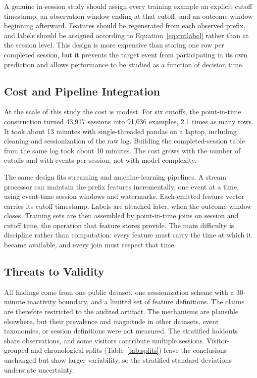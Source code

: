 \documentclass[conference, letterpaper]{IEEEtran}
\begin{document}
A genuine in-session study should assign every training example an explicit cutoff timestamp, an observation window ending at that cutoff, and an outcome window beginning afterward. Features should be regenerated from each observed prefix, and labels should be assigned according to Equation~\ref{eq:cutlabel} rather than at the session level. This design is more expensive than storing one row per completed session, but it prevents the target event from participating in its own prediction and allows performance to be studied as a function of decision time.

\subsection{Cost and Pipeline Integration}
At the scale of this study the cost is modest. For six cutoffs, the point-in-time construction turned 43,917 sessions into 91,036 examples, 2.1 times as many rows. It took about 13 minutes with single-threaded pandas on a laptop, including cleaning and sessionization of the raw log. Building the completed-session table from the same log took about 10 minutes. The cost grows with the number of cutoffs and with events per session, not with model complexity.

The same design fits streaming and machine-learning pipelines. A stream processor can maintain the prefix features incrementally, one event at a time, using event-time session windows and watermarks. Each emitted feature vector carries its cutoff timestamp. Labels are attached later, when the outcome window closes. Training sets are then assembled by point-in-time joins on session and cutoff time, the operation that feature stores provide. The main difficulty is discipline rather than computation: every feature must carry the time at which it became available, and every join must respect that time.

\subsection{Threats to Validity}
All findings come from one public dataset, one sessionization scheme with a 30-minute inactivity boundary, and a limited set of feature definitions. The claims are therefore restricted to the audited artifact. The mechanisms are plausible elsewhere, but their prevalence and magnitude in other datasets, event taxonomies, or session definitions were not measured. The stratified holdouts share observations, and some visitors contribute multiple sessions. Visitor-grouped and chronological splits (Table~\ref{tab:splits}) leave the conclusions unchanged but show larger variability, so the stratified standard deviations understate uncertainty.
\end{document}
